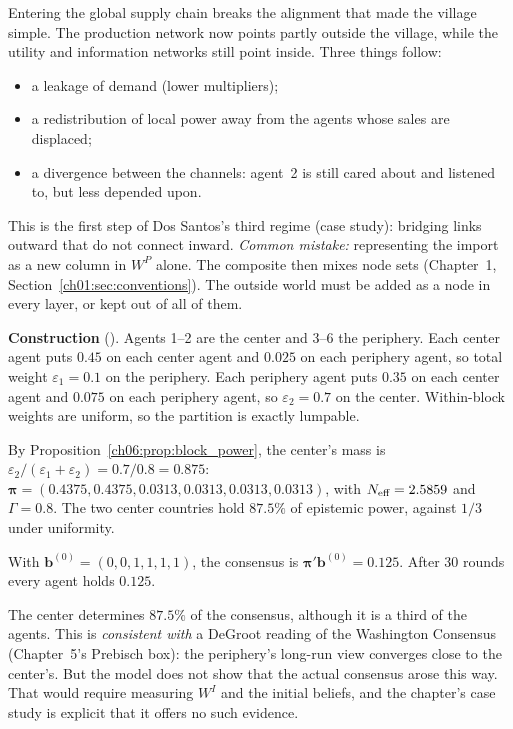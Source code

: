 \documentclass[../solutions_manual.tex]{subfiles}
\begin{document}
 Entering the global supply chain breaks the alignment that made the village simple. The production network now points partly outside the village, while the utility and information networks still point inside. Three things follow:
\begin{itemize}
\item a leakage of demand (lower multipliers);
\item a redistribution of local power away from the agents whose sales are displaced;
\item a divergence between the channels: agent~2 is still cared about and listened to, but less depended upon.
\end{itemize}
This is the first step of Dos Santos's third regime (case study): bridging links outward that do not connect inward. \emph{Common mistake:} representing the import as a new column in $W^P$ alone. The composite then mixes node sets (Chapter~1, Section~\ref{ch01:sec:conventions}). The outside world must be added as a node in every layer, or kept out of all of them.


\textbf{Construction} (\illustrative). Agents 1--2 are the center and 3--6 the periphery. Each center agent puts $0.45$ on each center agent and $0.025$ on each periphery agent, so total weight $\varepsilon_1 = 0.1$ on the periphery. Each periphery agent puts $0.35$ on each center agent and $0.075$ on each periphery agent, so $\varepsilon_2 = 0.7$ on the center. Within-block weights are uniform, so the partition is exactly lumpable.

 By Proposition~\ref{ch06:prop:block_power}, the center's mass is $\varepsilon_2/(\varepsilon_1 + \varepsilon_2) = 0.7/0.8 = 0.875$: $\boldsymbol\pi = (0.4375, 0.4375, 0.0313, 0.0313, 0.0313, 0.0313)$, with $N_{\text{eff}} = 2.5859$ and $\Gamma = 0.8$. The two center countries hold $87.5\%$ of epistemic power, against $1/3$ under uniformity.

 With $\mathbf b^{(0)} = (0, 0, 1, 1, 1, 1)$, the consensus is $\boldsymbol\pi'\mathbf b^{(0)} = 0.125$. After 30 rounds every agent holds $0.125$.

 The center determines $87.5\%$ of the consensus, although it is a third of the agents. This is \emph{consistent with} a DeGroot reading of the Washington Consensus (Chapter~5's Prebisch box): the periphery's long-run view converges close to the center's. But the model does not show that the actual consensus arose this way. That would require measuring $W^I$ and the initial beliefs, and the chapter's case study is explicit that it offers no such evidence.
\end{document}
